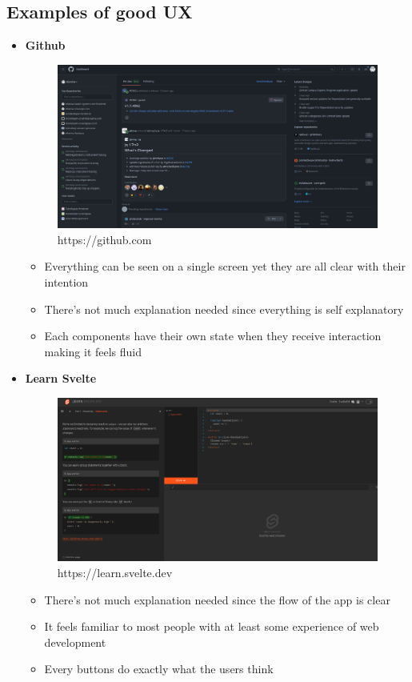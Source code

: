\documentclass[12pt,titlepage]{article}
\begin{document}
\subsection{Examples of good UX}
\begin{itemize}
    \item {
        \textbf{Github}
        \begin{figure}[h]
            \centering
            \includegraphics[width=.8\textwidth]{./images/github.png}
            \caption{https://github.com}
        \end{figure}
        \begin{itemize}
            \item Everything can be seen on a single screen yet they are all clear with their intention
            \item There's not much explanation needed since everything is self explanatory
            \item Each components have their own state when they receive interaction making it feels fluid
        \end{itemize}
    }
    \pagebreak
    \item {
        \textbf{Learn Svelte}
        \begin{figure}[h]
            \centering
            \includegraphics[width=.8\textwidth]{./images/learn-svelte.png}
            \caption{https://learn.svelte.dev}
        \end{figure}
        \begin{itemize}
            \item There's not much explanation needed since the flow of the app is clear
            \item It feels familiar to most people with at least some experience of web development
            \item Every buttons do exactly what the users think
        \end{itemize}
    }
\end{itemize}
\end{document}
